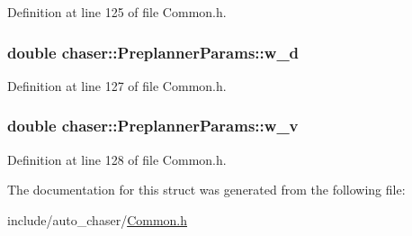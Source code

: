 Definition at line 125 of file Common.\+h.

\subsubsection[{\texorpdfstring{w\+\_\+d}{w_d}}]{\setlength{\rightskip}{0pt plus 5cm}double chaser\+::\+Preplanner\+Params\+::w\+\_\+d}\hypertarget{structchaser_1_1_preplanner_params_ae443edaa7e2912a6a7643272305c91f5}{}\label{structchaser_1_1_preplanner_params_ae443edaa7e2912a6a7643272305c91f5}


Definition at line 127 of file Common.\+h.

\subsubsection[{\texorpdfstring{w\+\_\+v}{w_v}}]{\setlength{\rightskip}{0pt plus 5cm}double chaser\+::\+Preplanner\+Params\+::w\+\_\+v}\hypertarget{structchaser_1_1_preplanner_params_a1778793e5b16806c867291c1a5471a04}{}\label{structchaser_1_1_preplanner_params_a1778793e5b16806c867291c1a5471a04}


Definition at line 128 of file Common.\+h.



The documentation for this struct was generated from the following file\+:\begin{DoxyCompactItemize}
\item 
include/auto\+\_\+chaser/\hyperlink{_common_8h}{Common.\+h}\end{DoxyCompactItemize}
